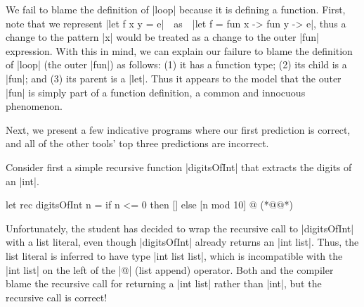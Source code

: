 We fail to blame the definition of |loop| because it is defining a
function.
%
First, note that we represent |let f x y = e|\ \ as\ \ |let f = fun x -> fun y -> e|,
thus a change to the pattern |x| would be treated as a change to the outer
|fun| expression.
%
With this in mind, we can explain our failure to blame the definition of
|loop| (the outer |fun|) as follows:
%
(1) it has a function type;
%
(2) its child is a |fun|; and
%
(3) its parent is a |let|.
%
Thus it appears to the model that the outer |fun| is simply part of a
function definition, a common and innocuous phenomenon.


\label{sec:correct-predictions}

Next, we present a few indicative programs where our first prediction is
correct, and all of the other tools' top three predictions are
incorrect.

Consider first a simple recursive function |digitsOfInt| that extracts
the digits of an |int|.
%
\begin{ecode}
  let rec digitsOfInt n =
    if n <= 0 then
      []
    else
      [n mod 10] @ (*@@*)
\end{ecode}
%
Unfortunately, the student has decided to wrap the recursive call to
|digitsOfInt| with a list literal, even though |digitsOfInt| already
returns an |int list|.
%
Thus, the list literal is inferred to have type |int list list|, which
is incompatible with the |int list| on the left of the |@| (list append)
operator.
%
Both \sherrloc and the \ocaml compiler blame the recursive call for
returning a |int list| rather than |int|, but the recursive call is
correct!

